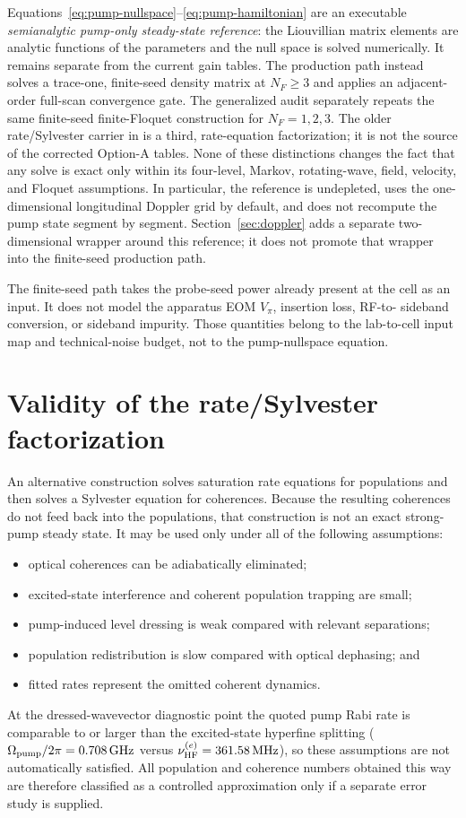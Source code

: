 \documentclass[11pt,a4paper]{article}
\newcommand{\GHz}{\,\mathrm{GHz}}
\newcommand{\MHz}{\,\mathrm{MHz}}
\begin{document}
Equations~\eqref{eq:pump-nullspace}--\eqref{eq:pump-hamiltonian} are an
executable \emph{semianalytic pump-only steady-state reference}: the
Liouvillian matrix elements are analytic functions of the parameters and the
null space is solved numerically. It remains separate from the current gain
tables. The production path instead solves a
trace-one, finite-seed density matrix at $N_F\geq3$ and applies an adjacent-order
full-scan convergence gate. The generalized audit separately repeats the same
finite-seed finite-Floquet construction for $N_F=1,2,3$.
The older rate/Sylvester carrier in
 is a third,
rate-equation factorization; it is not the source of the corrected
Option-A tables. None of these distinctions changes the fact that any solve is
exact only within its four-level, Markov, rotating-wave, field, velocity, and
Floquet assumptions. In particular, the reference is undepleted, uses the
one-dimensional longitudinal Doppler grid by default, and does not recompute
the pump state segment by segment. Section~\ref{sec:doppler} adds a separate
two-dimensional wrapper around this reference; it does not promote that
wrapper into the finite-seed production path.

The finite-seed path takes the probe-seed power already present at the cell as
an input. It does not model the apparatus EOM $V_\pi$, insertion loss, RF-to-
sideband conversion, or sideband impurity. Those quantities belong to the
lab-to-cell input map and technical-noise budget, not to the pump-nullspace
equation.

\section{Validity of the rate/Sylvester factorization}

An alternative construction solves saturation rate equations for populations
and then solves a Sylvester equation for coherences. Because the resulting
coherences do not feed back into the populations, that construction is not an
exact strong-pump steady state. It may be used only under all of the
following assumptions:
\begin{itemize}
\item optical coherences can be adiabatically eliminated;
\item excited-state interference and coherent population trapping are small;
\item pump-induced level dressing is weak compared with relevant separations;
\item population redistribution is slow compared with optical dephasing; and
\item fitted rates represent the omitted coherent dynamics.
\end{itemize}
At the dressed-wavevector diagnostic point the quoted pump Rabi rate is comparable to or larger
than the excited-state hyperfine splitting
($\Omega_{\rm pump}/2\pi=0.708\GHz$ versus
$\nu^{(e)}_{\rm HF}=361.58\MHz$), so these assumptions are not automatically
satisfied. All population and coherence
numbers obtained this way are therefore classified as a controlled
approximation only if a separate error study is supplied.
\end{document}
